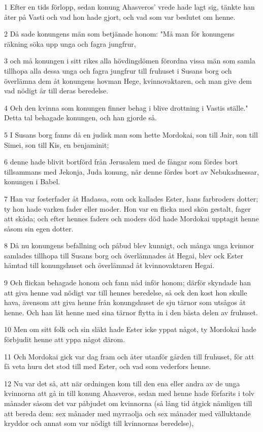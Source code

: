 \par 1 Efter en tids förlopp, sedan konung Ahasveros' vrede hade lagt sig, tänkte han åter på Vasti och vad hon hade gjort, och vad som var beslutet om henne.
\par 2 Då sade konungens män som betjänade honom: "Må man för konungens räkning söka upp unga och fagra jungfrur,
\par 3 och må konungen i sitt rikes alla hövdingdömen förordna vissa män som samla tillhopa alla dessa unga och fagra jungfrur till fruhuset i Susans borg och överlämna dem åt konungens hovman Hege, kvinnovaktaren, och man give dem vad nödigt är till deras beredelse.
\par 4 Och den kvinna som konungen finner behag i blive drottning i Vastis ställe." Detta tal behagade konungen, och han gjorde så.
\par 5 I Susans borg fanns då en judisk man som hette Mordokai, son till Jair, son till Simei, son till Kis, en benjaminit;
\par 6 denne hade blivit bortförd från Jerusalem med de fångar som fördes bort tillsammans med Jekonja, Juda konung, när denne fördes bort av Nebukadnessar, konungen i Babel.
\par 7 Han var fosterfader åt Hadassa, som ock kallades Ester, hans farbroders dotter; ty hon hade varken fader eller moder. Hon var en flicka med skön gestalt, fager att skåda; och efter hennes faders och moders död hade Mordokai upptagit henne såsom sin egen dotter.
\par 8 Då nu konungens befallning och påbud blev kunnigt, och många unga kvinnor samlades tillhopa till Susans borg och överlämnades åt Hegai, blev ock Ester hämtad till konungshuset och överlämnad åt kvinnovaktaren Hegai.
\par 9 Och flickan behagade honom och fann nåd inför honom; därför skyndade han att giva henne vad nödigt var till hennes beredelse, så ock den kost hon skulle hava, ävensom att giva henne från konungshuset de sju tärnor som utsågos åt henne. Och han lät henne med sina tärnor flytta in i den bästa delen av fruhuset.
\par 10 Men om sitt folk och sin släkt hade Ester icke yppat något, ty Mordokai hade förbjudit henne att yppa något därom.
\par 11 Och Mordokai gick var dag fram och åter utanför gården till fruhuset, för att få veta huru det stod till med Ester, och vad som vederfors henne.
\par 12 Nu var det så, att när ordningen kom till den ena eller andra av de unga kvinnorna att gå in till konung Ahasveros, sedan med henne hade förfarits i tolv månader såsom det var påbjudet om kvinnorna (så lång tid åtgick nämligen till att bereda dem: sex månader med myrraolja och sex månader med välluktande kryddor och annat som var nödigt till kvinnornas beredelse),
